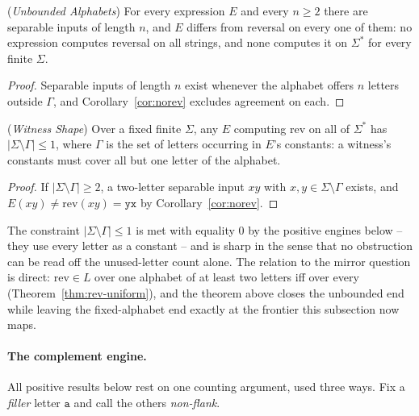 \documentclass[runningheads,envcountsect]{llncs}
\begin{document}
\begin{theorem}
    (\emph{Unbounded Alphabets})
    \label{thm:rev-unbounded}
    For every expression $E$ and every $n \geq 2$ there are separable inputs of length $n$, and $E$ differs from reversal on every one of them: no expression computes reversal on all strings, and none computes it on $\Sigma^*$ for every finite $\Sigma$.
\end{theorem}

\begin{proof}
    Separable inputs of length $n$ exist whenever the alphabet offers $n$ letters outside $\Gamma$, and Corollary~\ref{cor:norev} excludes agreement on each.
\end{proof}

\begin{corollary}
    (\emph{Witness Shape})
    \label{cor:witness-shape}
    Over a fixed finite $\Sigma$, any $E$ computing $\mathrm{rev}$ on all of $\Sigma^*$ has $|\Sigma \setminus \Gamma| \leq 1$, where $\Gamma$ is the set of letters occurring in $E$'s constants: a witness's constants must cover all but one letter of the alphabet.
\end{corollary}

\begin{proof}
    If $|\Sigma \setminus \Gamma| \geq 2$, a two-letter separable input $xy$ with $x, y \in \Sigma \setminus \Gamma$ exists, and $E(xy) \neq \mathrm{rev}(xy) = \mathtt{yx}$ by Corollary~\ref{cor:norev}.
\end{proof}

The constraint $|\Sigma \setminus \Gamma| \leq 1$ is met with equality $0$ by the positive engines below -- they use every letter as a constant -- and is sharp in the sense that no obstruction can be read off the unused-letter count alone. The relation to the mirror question is direct: $\mathrm{rev} \in L$ over one alphabet of at least two letters iff over every (Theorem~\ref{thm:rev-uniform}), and the theorem above closes the unbounded end while leaving the fixed-alphabet end exactly at the frontier this subsection now maps.

\paragraph{The complement engine.}

All positive results below rest on one counting argument, used three ways. Fix a \emph{filler} letter $\mathtt a$ and call the others \emph{non-flank}.
\end{document}
